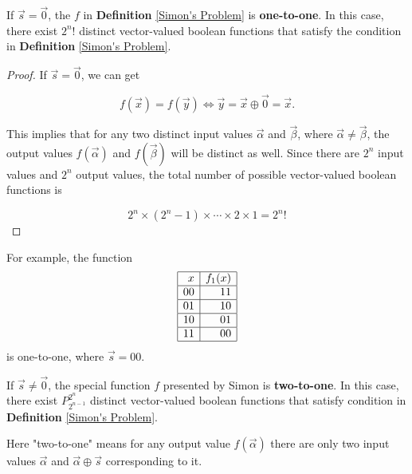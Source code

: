 \begin{property}
If $\vec{s}=\vec{0}$, the $f$ in \textbf{Definition} \ref{Simon's Problem} is \textbf{one-to-one}. In this case, there exist $2^n !$ distinct vector-valued boolean functions that satisfy the condition in \textbf{Definition} \ref{Simon's Problem}.
\end{property}

\begin{proof}
If $\vec{s} = \vec{0}$, we can get

\begin{equation}
    f(\vec{x})=f(\vec{y}) \iff \vec{y}=\vec{x}\oplus \vec{0} = \vec{x}.
\end{equation}

This implies that for any two distinct input values $\vec{\alpha}$ and $\vec{\beta}$, where $\vec{\alpha} \neq \vec{\beta}$, the output values $f(\vec{\alpha})$ and $f(\vec{\beta})$ will be distinct as well. Since there are $2^n$ input values and $2^n$ output values, the total number of possible vector-valued boolean functions is

\begin{equation}
    2^n \times (2^n-1) \times \cdots \times 2 \times 1 = 2^n!
\end{equation}
\end{proof}
For example, the function 
\begin{equation}
    \begin{array}{|r|r|}
	\hline x & f_1(x) \\
	\hline 00 & 11 \\
	\hline 01 & 10 \\
	\hline 10 & 01 \\
	\hline 11 & 00 \\
	\hline
\end{array}
\end{equation}
is one-to-one, where $\vec{s}=00$.

\begin{property}
If $\vec{s} \neq \vec{0}$, the special function $f$ presented by Simon is \textbf{two-to-one}. In this case, there exist $P^{2^n}_{2^{n-1}}$ distinct vector-valued boolean functions that satisfy condition in \textbf{Definition} \ref{Simon's Problem}.
\end{property}

\begin{mdframed}
Here "two-to-one" means for any output value $f(\vec{\alpha})$ there are only two input values $\vec{\alpha}$ and $\vec{\alpha} \oplus \vec{s}$ corresponding to it.
\end{mdframed}

